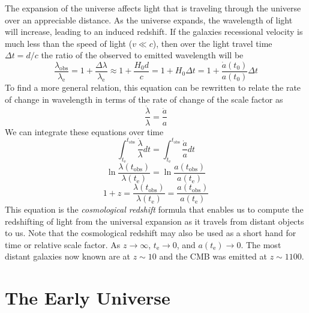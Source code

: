 \documentclass[]{article}
\begin{document}
The expansion of the universe affects light that is traveling through the
universe over an appreciable distance. As the universe expands, the wavelength
of light will increase, leading to an induced redshift. If the galaxies
recessional velocity is much less than the speed of light ($v\ll c$), then
over the light travel time $\Delta t = d/c$ the ratio of the observed to
emitted wavelength will be
\begin{equation}
\frac{\lambda_{\mathrm{obs}}}{\lambda_{\mathrm{e}}} = 1 + \frac{\Delta \lambda}{\lambda_{\mathrm{e}}} \approx 1+\frac{H_0 d}{c} = 1+ H_0 \Delta t = 1 + \frac{\dot{a}(t_0)}{a(t_0)} \Delta t
\end{equation}
\noindent
To find a more general relation, this
equation can be rewritten to relate the rate of change in wavelength in terms of
the rate of change of the scale factor as
\begin{equation}
\frac{\dot{\lambda}}{\lambda} = \frac{\dot{a}}{a}
\end{equation}
\noindent
We can integrate these equations over time
\begin{equation}
\int_{t_\mathrm{e}}^{t_\mathrm{obs}} \frac{\dot{\lambda}}{\lambda}d t = \int_{t_\mathrm{e}}^{t_\mathrm{obs}} \frac{\dot{a}}{a}d t 
\end{equation}
\begin{equation}
\ln \frac{\lambda(t_{\mathrm{obs}})}{\lambda(t_\mathrm{e})} = \ln \frac{a(t_{\mathrm{obs}})}{a(t_\mathrm{e})} 
\end{equation}
\begin{equation}
1+z = \frac{\lambda(t_{\mathrm{obs}})}{\lambda(t_\mathrm{e})} =  \frac{a(t_{\mathrm{obs}})}{a(t_\mathrm{e})} 
\end{equation}
\noindent
This equation is the {\it cosmological redshift} formula that enables us to compute the 
redshifting of light from the universal expansion as it travels from distant objects
 to us. Note that the cosmological redshift may also be used as a short hand for
 time or relative scale factor.  
 As $z\to\infty$, $t_\mathrm{e}\to0$, and $a(t_\mathrm{e})\to0$.
 The most distant galaxies now known are at $z\sim10$ and the CMB was
 emitted at $z\sim1100$.

\section{The Early Universe}
\end{document}
